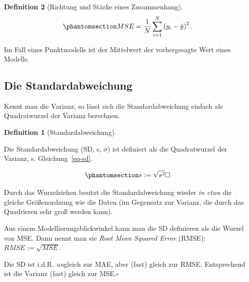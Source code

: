 \documentclass[
  a4paper,
  DIV=11]{scrreprt}
\theoremstyle{definition}
\theoremstyle{definition}
\theoremstyle{definition}
\newtheorem{definition}{Definition}[chapter]
\theoremstyle{remark}
\begin{document}
\begin{definition}[Richtung und Stärke eines
Zusammenhang]
\begin{equation}\phantomsection\label{eq-mse}{{\displaystyle MSE={\frac {1}{N}}\sum _{i=1}^{N}\left(y_{i}-{\hat {y}}\right)^{2}.}}\end{equation}

Im Fall eines Punktmodells ist der Mittelwert der vorhergesagte Wert
eines Modells.

\subsection{Die Standardabweichung}\label{die-standardabweichung}

Kennt man die Varianz, so lässt sich die Standardabweichung einfach als
Quadratwurzel der Varianz berechnen.

\begin{definition}[Standardabweichung]\protect\hypertarget{def-sd}{}\label{def-sd}

Die Standardabweichung (SD, s, \(\sigma\)) ist definiert als die
Quadratwurzel der Varianz, s. Gleichung~\ref{eq-sd}.

\begin{equation}\phantomsection\label{eq-sd}{s := \sqrt{s^2} \square}\end{equation}

\end{definition}

Durch das Wurzelziehen besitzt die Standardabweichung wieder \emph{in
etwa} die gleiche Größenordnung wie die Daten (im Gegensatz zur Varianz,
die durch das Quadrieren sehr groß werden kann).

Aus einem Modellierungsblickwinkel kann man die SD definieren als die
Wurzel von MSE. Dann nennt man sie \emph{Root Mean Squared Error}
(RMSE): \(RMSE := \sqrt{MSE}\).

\begin{tcolorbox}[enhanced jigsaw, leftrule=.75mm, opacitybacktitle=0.6, colback=white, colframe=quarto-callout-note-color-frame, coltitle=black, colbacktitle=quarto-callout-note-color!10!white, opacityback=0, left=2mm, breakable, titlerule=0mm, toptitle=1mm, bottomtitle=1mm, rightrule=.15mm, title=\textcolor{quarto-callout-note-color}{\faInfo}\hspace{0.5em}{Hinweis}, arc=.35mm, bottomrule=.15mm, toprule=.15mm]

Die SD ist i.d.R. \emph{un}gleich zur MAE, aber (fast) gleich zur RMSE.
Entsprechend ist die Varianz (fast) gleich zur MSE.\(\square\)

\end{tcolorbox}


\end{definition}
\end{document}
